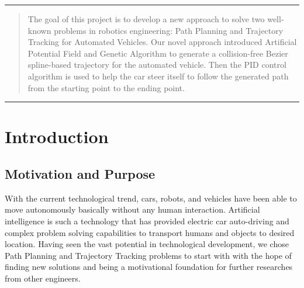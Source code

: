 \begin{center}
\rule{\textwidth}{0.5pt}
\end{center}
\begin{abstract}
The goal of this project is to develop a new approach to solve two well-known problems in robotics engineering: Path Planning and Trajectory Tracking for Automated Vehicles. Our novel approach introduced Artificial Potential Field and Genetic Algorithm to generate a collision-free Bezier spline-based trajectory for the automated vehicle. Then the PID control algorithm is used to help the car steer itself to follow the generated path from the starting point to the ending point.
\end{abstract}
\rule{\textwidth}{0.5pt}

\section{Introduction}
\subsection{Motivation and Purpose}
With the current technological trend, cars, robots, and vehicles have been able to move autonomously basically without any human interaction. Artificial intelligence is such a technology that has provided electric car auto-driving and complex problem solving capabilities to transport humans and objects to desired location. Having seen the vast potential in technological development, we chose Path Planning and Trajectory Tracking problems to start with with the hope of finding new solutions and being a motivational foundation for further researches from other engineers.

